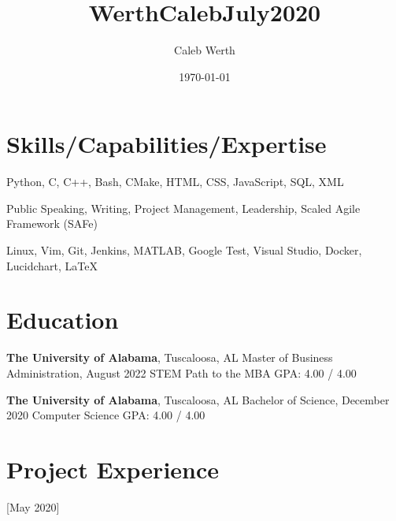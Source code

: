 \documentclass[hidelinks, 11pt]{article}
\title{WerthCalebJuly2020}
\author{Caleb Werth}
\date{\today}
\begin{document}
	\makecvtitle
	\vspace{1.0mm}
	
	\section{Skills/Capabilities/Expertise}
	
	\begin{description}[widest=Programming Langauges:]
		\item[Programming Languages:]	Python, C, C++, Bash, CMake, HTML, CSS, JavaScript, SQL, XML
		\item[Soft Skills:]	Public Speaking, Writing, Project Management, Leadership, Scaled Agile Framework (SAFe)
		\item[Tools:]	Linux, Vim, Git, Jenkins, MATLAB, Google Test, Visual Studio, Docker, Lucidchart, LaTeX
	\end{description}\leavevmode
	
	\section{Education}
	\vspace{-2.0mm}
	\begin{multicols}{2}
	
		\begin{minipage}{0.5\textwidth}
			\textbf{The University of Alabama}, Tuscaloosa, AL \newline
			Master of Business Administration, August 2022 \newline
			STEM Path to the MBA \newline
			GPA: 4.00 / 4.00
		\end{minipage}
	
		\begin{minipage}{0.5\textwidth}
			\textbf{The University of Alabama}, Tuscaloosa, AL \newline
			Bachelor of Science, December 2020 \newline
			Computer Science \newline
			GPA: 4.00 / 4.00
		\end{minipage}
	
	\end{multicols}
	
	\section{Project Experience}
	
		[May 2020]
	
\end{document}
